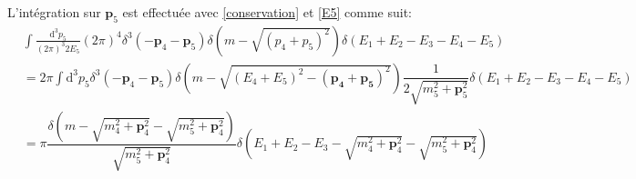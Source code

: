 \begin{enumerate}
    L'intégration sur $\mathbf{p}_5$ est effectuée avec \eqref{conservation} et \eqref{E5} comme suit:
    \begin{align}
        &\int \frac{\mathrm{d}^3 p_5}{(2 \pi)^3 2 E_5} (2 \pi)^4 \delta^3(-\mathbf{p}_4-\mathbf{p}_5) \delta\left(m-\sqrt{\left(p_4+p_5\right)^2}\right) \delta(E_1 + E_2 - E_3 - E_4 - E_{5}) \nonumber\\
        &= 2 \pi\int \mathrm{d}^3p_5 \delta^3(-\mathbf{p}_4-\mathbf{p}_5) \delta\left(m-\sqrt{(E_4+E_5)^2 - (\mathbf{p_4} + \mathbf{p_5})^2}\right) \dfrac{1}{2\sqrt{m^2_5 + \mathbf{p}_5^2}} \delta(E_1 + E_2 - E_3 - E_4 - E_5)\nonumber\\
        &= \pi \dfrac{\delta\left(m-\sqrt{m^2_4 + \mathbf{p}_4^2}-\sqrt{m^2_5 + \mathbf{p}_4^2}\right)}{\sqrt{m^2_5 + \mathbf{p}_4^2}} \delta\left(E_1 + E_2 - E_3 -\sqrt{m^2_4 + \mathbf{p}_4^2}-\sqrt{m^2_5 + \mathbf{p}_4^2}\right) \label{E5_done}
    \end{align}


\end{enumerate}
